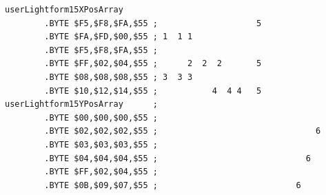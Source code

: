 \begin{lstlisting}[basicstyle=\ttfamily\scriptsize]
userLightform15XPosArray
        .BYTE $F5,$F8,$FA,$55 ;                    5            
        .BYTE $FA,$FD,$00,$55 ; 1  1 1                          
        .BYTE $F5,$F8,$FA,$55 ;                                 
        .BYTE $FF,$02,$04,$55 ;      2  2  2       5            
        .BYTE $08,$08,$08,$55 ; 3  3 3                          
        .BYTE $10,$12,$14,$55 ;           4  4 4   5            
userLightform15YPosArray      ;                                 
        .BYTE $00,$00,$00,$55 ;                                 
        .BYTE $02,$02,$02,$55 ;                                6
        .BYTE $03,$03,$03,$55 ;                                 
        .BYTE $04,$04,$04,$55 ;                              6  
        .BYTE $FF,$02,$04,$55 ;                                 
        .BYTE $0B,$09,$07,$55 ;                            6    
\end{lstlisting}

